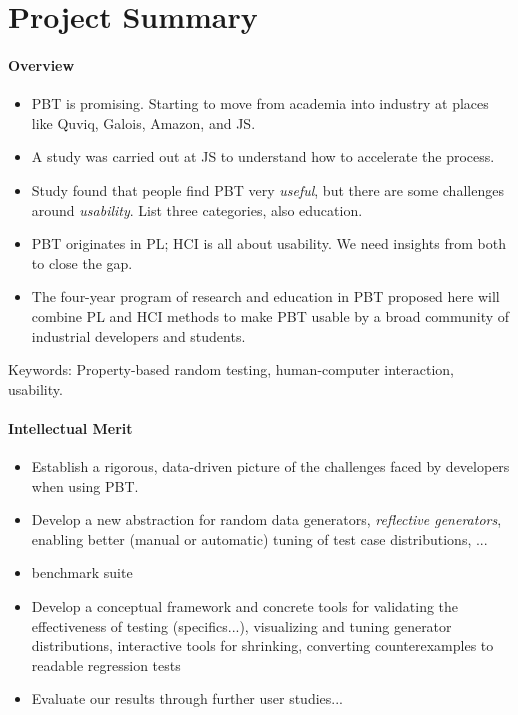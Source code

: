 \section*{Project Summary}


\paragraph*{Overview}
\begin{itemize}
\item PBT is promising.  Starting to move from academia into industry
at places like Quviq, Galois, Amazon, and JS.
\item A study was carried out at JS to understand how to accelerate the
process.
\item Study found that people find PBT very {\em useful}, but there are
some challenges around {\em usability}.  List three categories, also
education.
\item PBT originates in PL; HCI is all about usability.  We need
insights from both to close the gap.
\item The four-year program of research and education in
PBT proposed here will combine PL and HCI methods to make PBT usable by a broad
community of industrial developers and students.
\end{itemize}

Keywords: Property-based random testing, human-computer interaction,
usability.

\paragraph*{Intellectual Merit}
\begin{itemize}
\item Establish a rigorous, data-driven picture of the challenges
faced by developers when using PBT.
\item Develop a new abstraction for random data generators, {\em
  reflective generators}, enabling better (manual or automatic) tuning of test case
distributions, ...
\item benchmark suite
\item Develop a conceptual framework and concrete tools for validating
the effectiveness of testing (specifics...),
visualizing and tuning generator distributions,
interactive tools for shrinking,
converting counterexamples to readable regression tests
\item Evaluate our results through further user studies...
\end{itemize}

